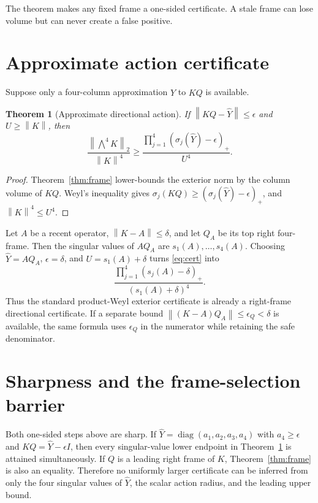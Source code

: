 \documentclass[12pt]{article}
\newtheorem{theorem}{Theorem}\newtheorem{proposition}[theorem]{Proposition}\newtheorem{corollary}[theorem]{Corollary}\newtheorem{remark}[theorem]{Remark}
\newcommand{\norm}[1]{\left\lVert#1\right\rVert}
\begin{document}
The theorem makes any fixed frame a one-sided certificate.  A stale frame
can lose volume but can never create a false positive.

\section{Approximate action certificate}
Suppose only a four-column approximation $\widehat Y$ to $KQ$ is available.

\begin{theorem}[Approximate directional action]\label{thm:approx}
If $\norm{KQ-\widehat Y}\leq\epsilon$ and $U\geq\norm K$, then
\begin{equation}\label{eq:cert}
 \frac{\norm{\bigwedge^4K}_2}{\norm K^4}
 \geq \frac{\prod_{j=1}^4
 (\sigma_j(\widehat Y)-\epsilon)_+}{U^4}.
\end{equation}
\end{theorem}
\begin{proof}
Theorem~\ref{thm:frame} lower-bounds the exterior norm by the column volume
of $KQ$.  Weyl's inequality gives
$\sigma_j(KQ)\geq(\sigma_j(\widehat Y)-\epsilon)_+$, and $\norm K^4\leq U^4$.
\end{proof}

Let $A$ be a recent operator, $\norm{K-A}\leq\delta$, and let $Q_A$ be its
top right four-frame.  Then the singular values of $AQ_A$ are
$s_1(A),\ldots,s_4(A)$.  Choosing $\widehat Y=AQ_A$, $\epsilon=\delta$, and
$U=s_1(A)+\delta$ turns \eqref{eq:cert} into
\[
 \frac{\prod_{j=1}^4(s_j(A)-\delta)_+}{(s_1(A)+\delta)^4}.
\]
Thus the standard product-Weyl exterior certificate is already a
right-frame directional certificate.  If a separate bound
$\norm{(K-A)Q_A}\leq\epsilon_Q<\delta$ is available, the same formula uses
$\epsilon_Q$ in the numerator while retaining the safe denominator.

\section{Sharpness and the frame-selection barrier}
Both one-sided steps above are sharp.  If
$\widehat Y=\operatorname{diag}(a_1,a_2,a_3,a_4)$ with $a_4\geq\epsilon$ and
$KQ=\widehat Y-\epsilon I$, then every singular-value lower endpoint in
Theorem~\ref{thm:approx} is attained simultaneously.  If $Q$ is a leading
right frame of $K$, Theorem~\ref{thm:frame} is also an equality.  Therefore
no uniformly larger certificate can be inferred from only the four singular
values of $\widehat Y$, the scalar action radius, and the leading upper bound.
\end{document}
